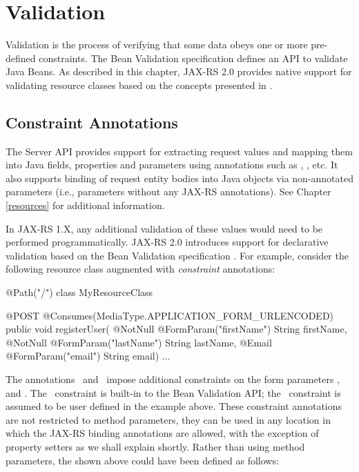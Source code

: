 \chapter{Validation}
\label{validation}

Validation is the process of verifying that some data obeys one or more pre-defined constraints. The Bean Validation specification \cite{bv11} defines an API to validate Java Beans. As described in this chapter, JAX-RS 2.0 provides native support for validating resource classes based on the concepts presented in \cite{bv11}.

\section{Constraint Annotations}
\label{constraint_annotations}

The Server API provides support for extracting request values and mapping them into Java fields, properties and parameters using annotations such as , , etc. It also supports binding of request entity bodies into Java objects via non-annotated parameters (i.e., parameters without any JAX-RS annotations). See Chapter \ref{resources} for additional information.

In JAX-RS 1.X, any additional validation of these values would need to be performed programmatically. JAX-RS 2.0 introduces support for declarative validation based on the Bean Validation specification \cite{bv11}. For example, consider the following resource class augmented with \emph{constraint} annotations:

\begin{listing}{1}
@Path("/")
class MyResourceClass {

    @POST
    @Consumes(MediaType.APPLICATION_FORM_URLENCODED)
    public void registerUser(
        @NotNull @FormParam("firstName") String firstName,
        @NotNull @FormParam("lastName") String lastName,
        @Email @FormParam("email") String email) {
        ...
    }
}
\end{listing}

The annotations \NotNull\ and \Email\ impose additional constraints on the form parameters ,  and . The \NotNull\ constraint is built-in to the Bean Validation API; the \Email\ constraint is assumed to be user defined in the example above. These constraint annotations are not restricted to method parameters, they can be used in any location in which the JAX-RS binding annotations are allowed, with the exception of property setters as we shall explain shortly. Rather than using method parameters, the  shown above could have been defined as follows:

